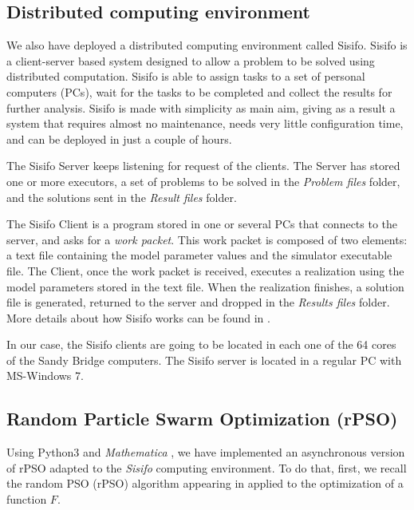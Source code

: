 \subsection{Distributed computing environment}
We also have deployed a distributed computing environment called Sisifo. Sisifo is a client-server based system designed to allow a problem to be solved using distributed computation. Sisifo is able to assign tasks to a set of personal computers (PCs), wait for the tasks to be completed and collect the results for further analysis. Sisifo is made with simplicity as main aim, giving as a result a system that requires almost no maintenance, needs very little configuration time, and can be deployed in just a couple of hours.

The Sisifo Server keeps listening for request of the clients. The Server has stored one or more executors, a set of problems to be solved in the \textit{Problem files} folder, and the solutions sent in the \textit{Result files} folder. 

The Sisifo Client is a program stored in one or several PCs that connects to the server, and asks for a \textit{work packet}. This work packet is composed of two elements: a text file containing the model parameter values and the simulator executable file. The Client, once the work packet is received, executes a realization using the model parameters stored in the text file. When the realization finishes, a solution file is generated, returned to the server and dropped in the \textit{Results files} folder. More details about how Sisifo works can be found in \cite{villanueva2013epidemic}.

In our case, the Sisifo clients are going to be located in each one of the 64 cores of the Sandy Bridge computers. The Sisifo server is located in a regular PC with MS-Windows 7.

\subsection{Random Particle Swarm Optimization (rPSO)}
Using Python3 \cite{python3} and \textit{Mathematica} \cite{Mathematica}, we have implemented an asynchronous version of rPSO adapted to the  \textit{Sisifo} computing environment. To do that, first, we recall the random PSO (rPSO) algorithm appearing in \cite{khemka2008exploratory} applied to the optimization of a function $F$.

